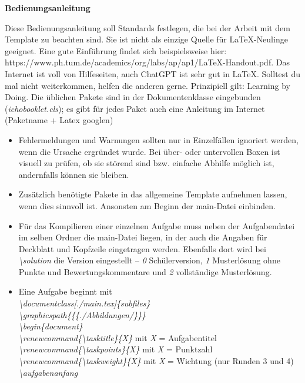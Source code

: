 \documentclass[./main.tex]{subfiles}
\begin{document}
\newpage
{\Large \textbf{Bedienungsanleitung}}\par
Diese Bedienungsanleitung soll Standards festlegen, die bei der Arbeit mit dem Template zu beachten sind. Sie ist nicht als einzige Quelle f\"ur \LaTeX-Neulinge geeignet. Eine gute Einf\"uhrung findet sich beispielsweise hier: https://www.ph.tum.de/academics/org/labs/ap/ap1/LaTeX-Handout.pdf. Das Internet ist voll von Hilfeseiten, auch ChatGPT ist sehr gut in \LaTeX. Solltest du mal nicht weiterkommen, helfen die anderen gerne. Prinzipiell gilt: Learning by Doing. Die \"ublichen Pakete sind in der Dokumentenklasse eingebunden (\textit{ichobooklet.cls}); es gibt f\"ur jedes Paket auch eine Anleitung im Internet (Paketname + Latex googlen)
\begin{itemize}
    \item Fehlermeldungen und Warnungen sollten nur in Einzelf\"allen ignoriert werden, wenn die Ursache ergr\"undet wurde. Bei \"uber- oder untervollen Boxen ist visuell zu pr\"ufen, ob sie st\"orend sind bzw. einfache Abhilfe m\"oglich ist, andernfalls k\"onnen sie bleiben. 
    \item Zus\"atzlich ben\"otigte Pakete in das allgemeine Template aufnehmen lassen, wenn dies sinnvoll ist. Ansonsten am Beginn der main-Datei einbinden. 
    \item F\"ur das Kompilieren einer einzelnen Aufgabe muss neben der Aufgabendatei im selben Ordner die main-Datei liegen, in der auch die Angaben f\"ur Deckblatt und Kopfzeile eingetragen werden. Ebenfalls dort wird bei \textit{\textbackslash solution} die Version eingestellt -- \textit{0} Sch\"ulerversion, \textit{1} Musterl\"osung ohne Punkte und Bewertungskommentare und \textit{2} vollst\"andige Musterl\"osung. 
    \item Eine Aufgabe beginnt mit \\\textit{\textbackslash documentclass[./main.tex]\{subfiles\}\\\textbackslash graphicspath\{\{\subfix\{./Abbildungen/\}\}\}\\\textbackslash begin\{document\}\\\textbackslash renewcommand\{\textbackslash tasktitle\}\{X\}} mit \textit{X} = Aufgabentitel\\\textit{\textbackslash renewcommand\{\textbackslash taskpoints\}\{X\}} mit \textit{X} = Punktzahl\\\textit{\textbackslash renewcommand\{\textbackslash taskweight\}\{X\}} mit \textit{X} = Wichtung (nur Runden 3 und 4)\\
    \textit{\textbackslash aufgabenanfang}\\

\end{itemize}
\end{document}

